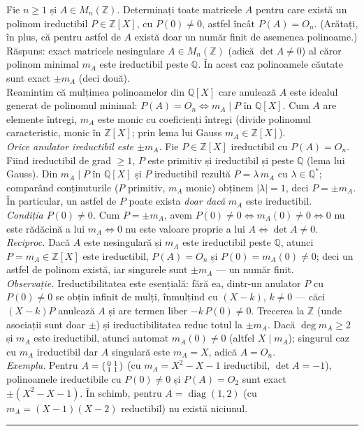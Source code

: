 Fie $n\ge1$ și $A\in M_n(\mathbb{Z})$. Determinați toate matricele $A$ pentru care există un polinom ireductibil $P\in\mathbb{Z}[X]$, cu $P(0)\neq0$, astfel încât $P(A)=O_n$. (Arătați, în plus, că pentru astfel de $A$ există doar un număr finit de asemenea polinoame.)
\sol Răspuns: exact matricele nesingulare $A\in M_n(\mathbb{Z})$ (adică $\det A\neq0$) al căror polinom minimal $m_A$ este ireductibil peste $\mathbb{Q}$. În acest caz polinoamele căutate sunt exact $\pm m_A$ (deci două).\\[2pt]
Reamintim că mulțimea polinoamelor din $\mathbb{Q}[X]$ care anulează $A$ este idealul generat de polinomul minimal: $P(A)=O_n\Leftrightarrow m_A\mid P$ în $\mathbb{Q}[X]$. Cum $A$ are elemente întregi, $m_A$ este monic cu coeficienți întregi (divide polinomul caracteristic, monic în $\mathbb{Z}[X]$; prin lema lui Gauss $m_A\in\mathbb{Z}[X]$).\\[2pt]
\emph{Orice anulator ireductibil este $\pm m_A$.} Fie $P\in\mathbb{Z}[X]$ ireductibil cu $P(A)=O_n$. Fiind ireductibil de grad $\ge1$, $P$ este primitiv și ireductibil și peste $\mathbb{Q}$ (lema lui Gauss). Din $m_A\mid P$ în $\mathbb{Q}[X]$ și $P$ ireductibil rezultă $P=\lambda\,m_A$ cu $\lambda\in\mathbb{Q}^{*}$; comparând conținuturile ($P$ primitiv, $m_A$ monic) obținem $|\lambda|=1$, deci $P=\pm m_A$. În particular, un astfel de $P$ poate exista \emph{doar dacă} $m_A$ este ireductibil.\\[2pt]
\emph{Condiția $P(0)\neq0$.} Cum $P=\pm m_A$, avem $P(0)\neq0\Leftrightarrow m_A(0)\neq0\Leftrightarrow 0$ nu este rădăcină a lui $m_A\Leftrightarrow 0$ nu este valoare proprie a lui $A\Leftrightarrow\det A\neq0$.\\[2pt]
\emph{Reciproc.} Dacă $A$ este nesingulară și $m_A$ este ireductibil peste $\mathbb{Q}$, atunci $P=m_A\in\mathbb{Z}[X]$ este ireductibil, $P(A)=O_n$ și $P(0)=m_A(0)\neq0$; deci un astfel de polinom există, iar singurele sunt $\pm m_A$ --- un număr finit.\\[2pt]
\emph{Observație.} Ireductibilitatea este esențială: fără ea, dintr-un anulator $P$ cu $P(0)\neq0$ se obțin infinit de mulți, înmulțind cu $(X-k)$, $k\neq0$ --- căci $(X-k)P$ anulează $A$ și are termen liber $-k\,P(0)\neq0$. Trecerea la $\mathbb{Z}$ (unde asociații sunt doar $\pm$) și ireductibilitatea reduc totul la $\pm m_A$. Dacă $\deg m_A\ge2$ și $m_A$ este ireductibil, atunci automat $m_A(0)\neq0$ (altfel $X\mid m_A$); singurul caz cu $m_A$ ireductibil dar $A$ singulară este $m_A=X$, adică $A=O_n$.\\[2pt]
\emph{Exemplu.} Pentru $A=\begin{psmallmatrix}0&1\\1&1\end{psmallmatrix}$ (cu $m_A=X^2-X-1$ ireductibil, $\det A=-1$), polinoamele ireductibile cu $P(0)\neq0$ și $P(A)=O_2$ sunt exact $\pm(X^2-X-1)$. În schimb, pentru $A=\operatorname{diag}(1,2)$ (cu $m_A=(X-1)(X-2)$ reductibil) nu există niciunul.
\vspace{1mm}\hrule

